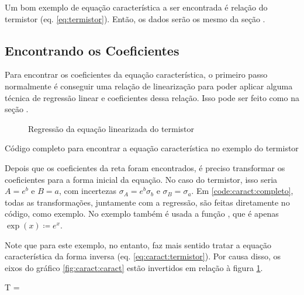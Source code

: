 Um bom exemplo de equação característica a ser encontrada é relação do termistor (eq. \ref{eq:termistor}). Então, os dados serão os mesmo da seção .


\subsection{Encontrando os Coeficientes}

    Para encontrar os coeficientes da equação característica, o primeiro passo normalmente é conseguir uma relação de linearização para poder aplicar alguma técnica de regressão linear e coeficientes dessa relação. Isso pode ser feito como na seção .

    \begin{figure}[H]
        \centering
        

        \caption{Regressão da equação linearizada do termistor}
        \label{fig:caract:regres}
    \end{figure}

    \begin{listing}[H]
        \caption{Código completo para encontrar a equação característica no exemplo do termistor}
        \label{code:caract:completo}

    \end{listing}

    Depois que os coeficientes da reta foram encontrados, é preciso transformar os coeficientes para a forma inicial da equação. No caso do termistor, isso seria $A = e^b$ e $B = a$, com incertezas $\sigma_A = e^b \sigma_b$ e $\sigma_B = \sigma_a$. Em \ref{code:caract:completo}, todas as transformações, juntamente com a regressão, são feitas diretamente no código, como exemplo. No exemplo também é usada a função , que é apenas $\exp(x) \coloneqq e^x$.

    Note que para este exemplo, no entanto, faz mais sentido tratar a equação característica da forma inversa (eq. \ref{eq:caract:termistor}). Por causa disso, os eixos do gráfico \ref{fig:caract:caract} estão invertidos em relação à figura \ref{fig:caract:regres}.

    \begin{equacao} \label{eq:caract:termistor}
        T = 
    \end{equacao}


